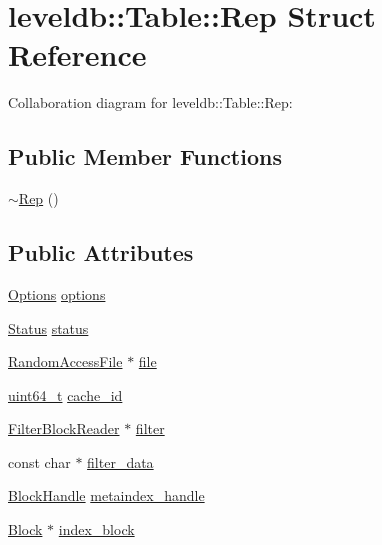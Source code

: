 \hypertarget{structleveldb_1_1_table_1_1_rep}{}\section{leveldb\+:\+:Table\+:\+:Rep Struct Reference}
\label{structleveldb_1_1_table_1_1_rep}


Collaboration diagram for leveldb\+:\+:Table\+:\+:Rep\+:
\subsection*{Public Member Functions}
\begin{DoxyCompactItemize}
\item 
\hyperlink{structleveldb_1_1_table_1_1_rep_a589eccb49554eb53054c95f5e6b5aac3}{$\sim$\+Rep} ()
\end{DoxyCompactItemize}
\subsection*{Public Attributes}
\begin{DoxyCompactItemize}
\item 
\hyperlink{structleveldb_1_1_options}{Options} \hyperlink{structleveldb_1_1_table_1_1_rep_a96ff2b389369e1b0706b090961065740}{options}
\item 
\hyperlink{classleveldb_1_1_status}{Status} \hyperlink{structleveldb_1_1_table_1_1_rep_aceaddad6024db9f34af2358503e4c089}{status}
\item 
\hyperlink{classleveldb_1_1_random_access_file}{Random\+Access\+File} $\ast$ \hyperlink{structleveldb_1_1_table_1_1_rep_a5b96b0d545bb3dbe2bccdefab1a83092}{file}
\item 
\hyperlink{stdint_8h_aaa5d1cd013383c889537491c3cfd9aad}{uint64\+\_\+t} \hyperlink{structleveldb_1_1_table_1_1_rep_af5beb2186a60560f5381271ad53420b8}{cache\+\_\+id}
\item 
\hyperlink{classleveldb_1_1_filter_block_reader}{Filter\+Block\+Reader} $\ast$ \hyperlink{structleveldb_1_1_table_1_1_rep_a35acf83732a3dea3df5869cb05c1cb5f}{filter}
\item 
const char $\ast$ \hyperlink{structleveldb_1_1_table_1_1_rep_a2dd458aa96c0a357414f13354810cea9}{filter\+\_\+data}
\item 
\hyperlink{classleveldb_1_1_block_handle}{Block\+Handle} \hyperlink{structleveldb_1_1_table_1_1_rep_a11500653a2db8ba301bca5027a508789}{metaindex\+\_\+handle}
\item 
\hyperlink{classleveldb_1_1_block}{Block} $\ast$ \hyperlink{structleveldb_1_1_table_1_1_rep_ae69d991c9b8ec7330b22acc06a932fe8}{index\+\_\+block}
\end{DoxyCompactItemize}


